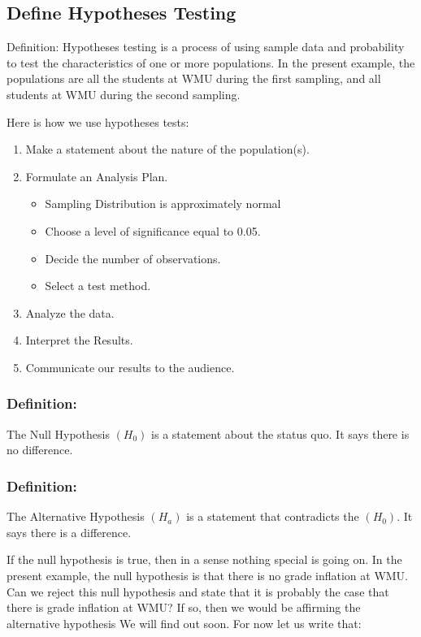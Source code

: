 \documentclass[11pt, chapterprefix=true]{scrbook}\usepackage[]{graphicx}\usepackage[]{color}
\begin{document}
\subsection{Define Hypotheses Testing}

Definition: Hypotheses testing is a process of using sample data and probability to test the characteristics of one or more populations. In the present example, the populations are all the students at WMU during the first sampling, and all students at WMU during the second sampling.

Here is how we use hypotheses tests:

\begin{enumerate}
\item Make a statement about the nature of the population(s). 
\item Formulate an Analysis Plan.
  \begin{itemize}
  \item Sampling Distribution is approximately normal 
  \item Choose a level of significance equal to 0.05.
  \item Decide the number of observations.
  \item Select a test method.
  \end{itemize}
\item Analyze the data.
\item Interpret the Results.
\item Communicate our results to the audience.
\end{enumerate}

\subsubsection{Definition:} The Null Hypothesis $(H_0)$ is a statement about the status quo. It says there is no difference.

\subsubsection{Definition:} The Alternative Hypothesis $(H_a)$ is a statement that contradicts the $(H_0)$. It says there is a difference.

If the null hypothesis is true, then in a sense nothing special is going on. In the present example, the null hypothesis is that there is no grade inflation at WMU. Can we reject this null hypothesis and state that it is probably the case that there is grade inflation at WMU? If so, then we would be affirming the alternative hypothesis We will find out soon. For now let us write that:
\end{document}
